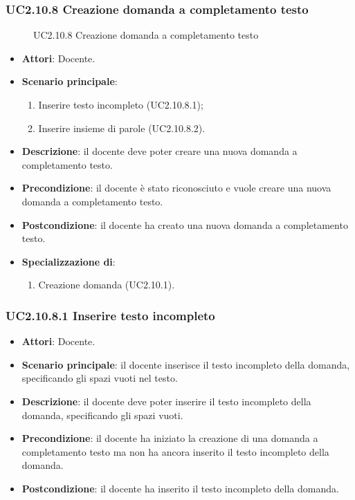 \subsubsection{UC2.10.8 Creazione domanda a completamento testo}
\begin{figure}[H]
\centering
\noindent{}
\caption{UC2.10.8 Creazione domanda a completamento testo}
\end{figure}
\begin{itemize}
\item \textbf{Attori}: Docente.
\item \textbf{Scenario principale}:
\begin{enumerate}
\item Inserire testo incompleto (UC2.10.8.1);
\item Inserire insieme di parole (UC2.10.8.2).
\end{enumerate}
\item \textbf{Descrizione}: il docente deve poter creare una nuova domanda a completamento testo.
\item \textbf{Precondizione}: il docente è stato riconosciuto e vuole creare una nuova domanda a completamento testo.
\item \textbf{Postcondizione}: il docente ha creato una nuova domanda a completamento testo.
\item \textbf{Specializzazione di}:
\begin{enumerate}
\item Creazione domanda (UC2.10.1).
\end{enumerate}
\end{itemize}
\subsubsection{UC2.10.8.1 Inserire testo incompleto}
\begin{itemize}
\item \textbf{Attori}: Docente.
\item \textbf{Scenario principale}: il docente inserisce il testo incompleto della domanda, specificando gli spazi vuoti nel testo.
\item \textbf{Descrizione}: il docente deve poter inserire il testo incompleto della domanda, specificando gli spazi vuoti.
\item \textbf{Precondizione}: il docente ha iniziato la creazione di una domanda a completamento testo ma non ha ancora inserito il testo incompleto della domanda.
\item \textbf{Postcondizione}: il docente ha inserito il testo incompleto della domanda.
\end{itemize}
